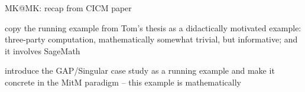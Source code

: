 \begin{todolist}{MK@MK: recap from CICM paper}
\item copy the running example from Tom's thesis as a didactically motivated example:
  three-party computation, mathematically somewhat trivial, but informative; and it
  involves SageMath
\item introduce the GAP/Singular case study as a running example and make it concrete in
  the MitM paradigm -- this example is mathematically
\end{todolist}





